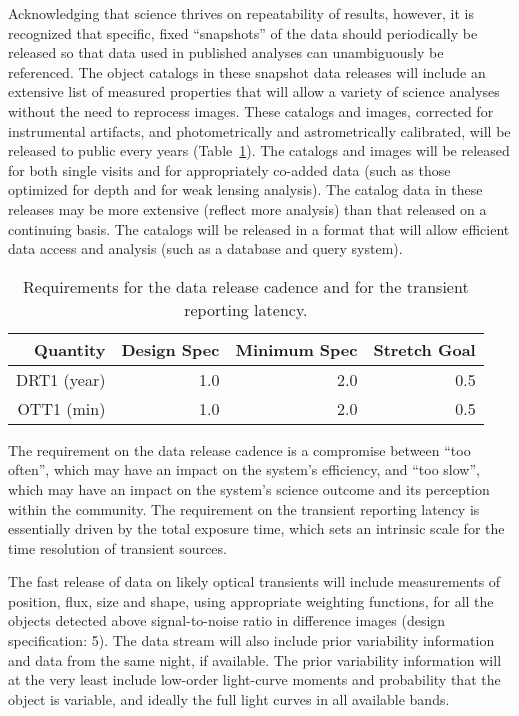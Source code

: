 Acknowledging that science thrives on repeatability of results, however, it
is recognized that specific, fixed ``snapshots'' of the data should
periodically be released so that data used in published analyses can
unambiguously be referenced. The object catalogs in these snapshot data
releases will include an extensive list of measured properties that will
allow a variety of science analyses without the need to reprocess
images. These catalogs and images, corrected for instrumental artifacts,
and photometrically and astrometrically calibrated, will be released to
public every
years (Table~\ref{TDMcadence}). The catalogs and images will be released
for both single visits and for appropriately co-added data (such as those
optimized for depth and for weak lensing analysis). The catalog data in
these releases may be more extensive (\ie reflect more analysis)
than that released on a continuing basis. The catalogs will be released in
a format that will allow efficient data access and analysis (such as a
database and query system).

\begin{table}[h]
\begin{tabular}{|r|r|r|r|}
\hline
     Quantity         &   Design Spec & Minimum Spec  & Stretch Goal   \\
\hline
    DRT1 (year)       &       1.0     &      2.0      &       0.5     \\
    OTT1 (min)        &       1.0     &      2.0      &       0.5     \\
\hline
\end{tabular}
\caption{Requirements for the data release cadence and for the transient
reporting latency.}
\label{TDMcadence}
\end{table}

The requirement on the data release cadence is a compromise between ``too
often'', which may have an impact on the system's efficiency, and ``too
slow'', which may have an impact on the system's science outcome and its
perception within the community.  The requirement on the transient
reporting latency is essentially driven by the total exposure time, which
sets an intrinsic scale for the time resolution of transient sources.

The fast release of data on likely optical transients will include
measurements of position, flux, size and shape, using appropriate
weighting functions, for all the objects detected above
signal-to-noise ratio in difference images (design specification: 5).
The data stream will also include prior variability information and
data from the same night, if available. The prior variability
information will at the very least include low-order light-curve moments
and probability that the object is variable, and ideally the full
light curves in all available bands.

